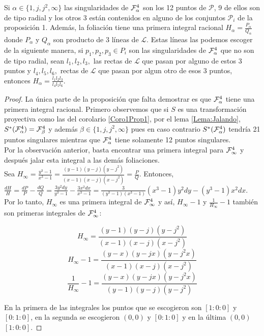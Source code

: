 \begin{Proposicion}
\label{Prop:3}
Si $\alpha\in\{1,j,j^2,\infty\}$ las singularidades de $\Fol[4]{\alpha}$ son los 12 puntos de $\mathcal{P}$, 9 de ellos son de tipo radial y los otros 3 están contenidos en alguno de los conjuntos $\mathcal{P}_i$ de la proposición 1. Además, la foliación tiene una primera integral racional $H_\alpha=\tfrac{P_\alpha}{Q_\alpha}$ donde $P_\alpha$ y $Q_\alpha$ son producto de 3 líneas de $\mathcal{L}$. Estas líneas las podemos escoger de la siguiente manera, si $p_1,p_2,p_3\in\mathit{P}_i$ son las singularidades de $\Fol[4]{\alpha}$ que no son de tipo radial, sean $\mathit{l}_1, \mathit{l}_2, \mathit{l}_3,$ las rectas de $\mathcal{L}$ que pasan por alguno de estos 3 puntos y $\mathit{l}_4, \mathit{l}_5, \mathit{l}_6,$ rectas de $\mathcal{L}$ que pasan por algun otro de esos 3 puntos, entonces $H_\alpha=\tfrac{\mathit{l}_1\mathit{l}_2\mathit{l}_3}{\mathit{l}_4\mathit{l}_5\mathit{l}_6}$.
\end{Proposicion}

\begin{proof}
La única parte de la proposición que falta demostrar es que $\Fol[4]{\alpha}$ tiene una primera integral racional. Primero observemos que si $S$ es una transformación proyectiva como las del corolario \ref{Coro1Prop1}, por el lema \ref{Lema:Jalando}, $S^*(\Fol[4]{\alpha})=\Fol[4]{\beta}$ y además $\beta\in\{1,j,j^2,\infty\}$ pues en caso contrario $S^*(\Fol[4]{\alpha})$ tendría 21 puntos singulares mientras que $\Fol[4]{\alpha}$ tiene solamente 12 puntos singulares.
\\

Por la observación anterior, basta encontrar una primera integral para $\Fol[4]{\infty}$ y después jalar esta integral a las demás foliaciones.
\\

Sea $H_\infty = \tfrac{y^3-1}{x^3-1} = \tfrac{(y-1)(y-j)(y-j^2)}{(x-1)(x-j)(x-j^2)} = \tfrac{P}{Q}$. Entonces, $\tfrac{dH}{H} = \tfrac{dP}{P} - \tfrac{dQ}{Q} = \tfrac{3y^2dy}{y^3-1} - \tfrac{3x^2dx}{x^3-1} = \tfrac{3}{(y^3-1)(x^3-1)}(x^3-1)y^2dy - (y^3-1)x^2dx$. Por lo tanto, $H_\infty$ es una primera integral de $\Fol[4]{\infty}$ y así, $H_\infty - 1$ y $\tfrac{1}{H_\infty} - 1$ también son primeras integrales de $\Fol[4]{\infty}$:

$$H_\infty = \frac{(y-1)(y-j)(y-j^2)}{(x-1)(x-j)(x-j^2)}$$
$$H_\infty - 1 = \frac{(y-x)(y-jx)(y-j^2x)}{(x-1)(x-j)(x-j^2)}$$
$$\frac{1}{H_\infty} - 1 = \frac{(y-x)(y-jx)(y-j^2x)}{(y-1)(y-j)(y-j^2)}$$

En la primera de las integrales los puntos que se escogieron son $[1:0:0]$ y $[0:1:0]$, en la segunda se escogieron $(0,0)$ y $[0:1:0]$ y en la última $(0,0)$  $[1:0:0]$.
\end{proof}

